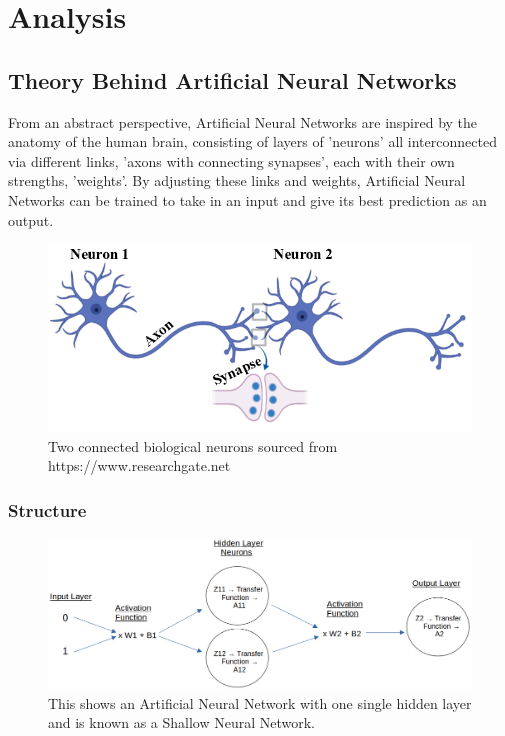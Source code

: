 \documentclass[./project-report/src/latex/project-report.tex]{subfiles}
\begin{document}
\maketitle

\clearpage
\section{Analysis}

\subsection{Theory Behind Artificial Neural Networks}
\label{sec:ann-theory}

From an abstract perspective, Artificial Neural Networks are inspired by the anatomy of the human brain, consisting of layers of 'neurons' all interconnected via 
different links, 'axons with connecting synapses', each with their own strengths, 'weights'. By adjusting these links and weights, Artificial Neural Networks can be trained 
to take in an input and give its best prediction as an output.

\begin{figure}[h!]
\centering
\includegraphics[width=1\textwidth]{./project-report/src/images/connected-neurons.png}
\caption{Two connected biological neurons sourced from https://www.researchgate.net}
\end{figure}

\vspace{5mm}

\subsubsection{Structure}

\begin{figure}[h!]
\centering
\includegraphics[width=1\textwidth]{./project-report/src/images/shallow-ann-diagram.png}
\caption{This shows an Artificial Neural Network with one single hidden layer and is known as a Shallow Neural Network.}
\end{figure}
\end{document}
